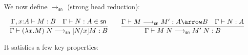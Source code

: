 \documentclass{article}
\newcommand{\csn}{\mathsf{sn}}
\newcommand{\red}{\longrightarrow}
\newcommand{\redsn}{\longrightarrow_\csn}
\begin{document}
We now define $\redsn$ (strong head reduction):

\[
\begin{array}{l}
\infer{\Gamma \vdash (\lambda x.M)\;N \redsn [N/x]M : B}{\Gamma, x{:}A \vdash M : B \quad \Gamma \vdash N : A \in \csn }
\qquad
\infer{\Gamma \vdash M\;N \redsn M'\;N : B}{\Gamma \vdash M \redsn M' : A \arrow B \quad \Gamma \vdash N : A}
\end{array}
\]

\noindent It satisfies a few  key properties:

\end{document}
